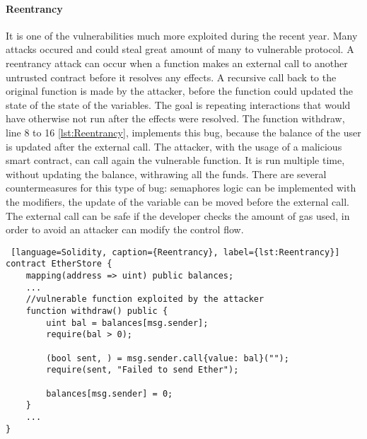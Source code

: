 \documentclass[a4paper,sigconf, language=french,
language=german, language=spanish, language=english]{acmart}
\begin{document}
\paragraph{Reentrancy} It is one of the vulnerabilities much more exploited during the recent year. 
Many attacks occured and could steal great amount of many to vulnerable protocol. 
A reentrancy attack can occur when a function makes an external call to another untrusted contract 
before it resolves any effects. 
A recursive call back to the original function is made by the attacker, before 
the function could updated the state of the state of the variables. 
The goal is repeating interactions that would have otherwise not run after the effects were resolved. 
The function withdraw, line 8 to 16 \autoref{lst:Reentrancy}, implements this bug, because the balance of the user is updated after the external call. 
The attacker, with the usage of a malicious smart contract, can call again the vulnerable function. 
It is run multiple time, without updating the balance, withrawing all the funds. There are several countermeasures for this type of bug: 
semaphores logic can be implemented with the modifiers, the update of the variable can be moved before the external call. 
The external call can be safe if the developer checks the amount of gas used, in order to avoid an attacker can modify the control flow. 
\begin{lstlisting} [language=Solidity, caption={Reentrancy}, label={lst:Reentrancy}]
contract EtherStore {
    mapping(address => uint) public balances;
    ...
    //vulnerable function exploited by the attacker
    function withdraw() public {
        uint bal = balances[msg.sender];
        require(bal > 0);

        (bool sent, ) = msg.sender.call{value: bal}("");
        require(sent, "Failed to send Ether");

        balances[msg.sender] = 0;
    }
    ...
}
  
\end{lstlisting}
\end{document}
